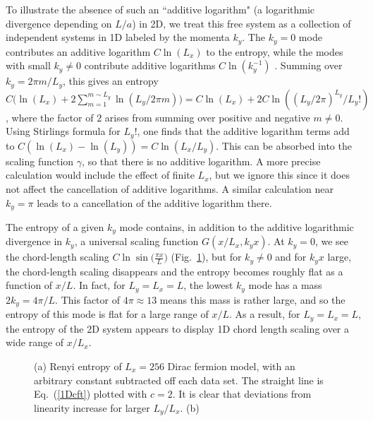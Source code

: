\documentclass[prl,aps,twocolumn,floatfix,amsmath,amssymb,superscriptaddress,tightenlines]{revtex4}
\begin{document}
To illustrate the absence of such an ``additive logarithm" (a logarithmic divergence depending on $L/a$) in 2D,
we treat this free system as a collection of independent systems in 1D labeled by the momenta $k_y$.
The $k_y=0$ mode contributes an additive logarithm $C \ln(L_x)$ to the entropy, while the modes with small $k_y \neq 0$ contribute additive logarithms $C \ln(k_y^{-1})$ \cite{Holzhey,Korepin,Cardy}. Summing over $k_y=2\pi m/L_y$, this gives an entropy $C \big( \ln(L_x)+2\sum_{m=1}^{m \sim L_y} \ln(L_y/2 \pi m) \big)=C\ln(L_x) + 2 C\ln((L_y/2\pi)^{L_y}/L_y!)$, where the factor of $2$ arises from summing over positive and negative $m\neq 0$.  Using Stirlings formula for $L_y!$, one finds that the additive logarithm terms add to $C(\ln(L_x)-\ln(L_y))=C\ln(L_x/L_y)$. This can be absorbed into the scaling function $\gamma$, so that there is no additive logarithm.  A more precise calculation would include the effect of finite $L_x$, but we ignore this since it does not affect the cancellation of additive logarithms. A similar calculation near $k_y=\pi$ leads to a cancellation of the additive logarithm there.


The entropy of a given $k_y$ mode contains, in addition to the additive logarithmic divergence in $k_y$, a universal scaling function $G(x/L_x,k_y x)$.  At $k_y=0$, we see the chord-length scaling $C \ln\sin\big( \frac{\pi x}{L} \big)$ (Fig.~\ref{fig:dirac}), but for $k_y \neq 0$ and for $k_y x$ large, the chord-length scaling disappears and the entropy becomes roughly flat as a function of $x/L$.  In fact, for $L_y=L_x=L$, the lowest $k_y$ mode has a mass $2 k_y=4\pi/L$. This factor of $4\pi\approx 13$ means this mass is rather large, and so the entropy of this mode is flat for a large range of $x/L$.  As a result, for $L_y=L_x=L$, the entropy of the 2D system appears to display 1D chord length scaling over a wide range of $x/L_x$.

 \begin{figure}
   \begin{center}
   \end{center}
   \caption{(a) Renyi entropy of $L_x=256$ Dirac fermion model, with an arbitrary constant subtracted off each data set.
    The straight line is Eq.~(\ref{1Dcft}) plotted with $c=2$.
    It is clear that deviations from linearity increase for larger $L_y/L_x$. (b) 
   }
   \label{fig:dirac}
 \end{figure}
 
\end{document}
